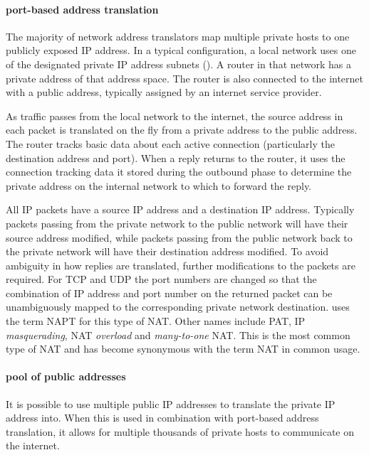 \paragraph{port-based address translation}
The majority of network address translators map multiple private hosts to one publicly exposed \acs{IP} address.
In a typical configuration, a local network uses one of the designated private \acs{IP} address subnets ().
A router in that network has a private address of that address space.
The router is also connected to the internet with a public address, typically assigned by an internet service provider.

As traffic passes from the local network to the internet, the source address in each packet is translated on the fly from a private address to the public address.
The router tracks basic data about each active connection (particularly the destination address and port).
When a reply returns to the router, it uses the connection tracking data it stored during the outbound phase to determine the private address on the internal network to which to forward the reply.

All \acs{IP} packets have a source \acs{IP} address and a destination \acs{IP} address.
Typically packets passing from the private network to the public network will have their source address modified, while packets passing from the public network back to the private network will have their destination address modified.
To avoid ambiguity in how replies are translated, further modifications to the packets are required.
For \acs{TCP} and \acs{UDP} the port numbers are changed so that the combination of \acs{IP} address and port number on the returned packet can be unambiguously mapped to the corresponding private network destination.
 uses the term \gls{NAPT} for this type of \acs{NAT}.
Other names include \gls{PAT}, \acs{IP} \emph{masquerading}, \acs{NAT} \emph{overload} and \emph{many-to-one} \acs{NAT}.
This is the most common type of \acs{NAT} and has become synonymous with the term \acs{NAT} in common usage.

\paragraph{pool of public addresses}
It is possible to use multiple public \acs{IP} addresses to translate the private \acs{IP} address into.
When this is used in combination with port-based address translation, it allows for multiple thousands of private hosts to communicate on the internet.

